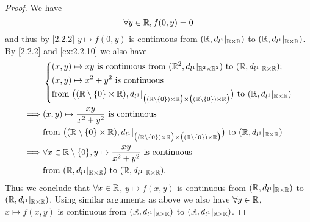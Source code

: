 \begin{proof}
  We have
  \[
    \forall y \in \mathbb{R}, f(0, y) = 0
  \]
  and thus by \cref{2.2.2} \(y \mapsto f(0, y)\) is continuous from \((\mathbb{R}, d_{l^1}|_{\mathbb{R} \times \mathbb{R}})\) to \((\mathbb{R}, d_{l^1}|_{\mathbb{R} \times \mathbb{R}})\).
  By \cref{2.2.2} and \cref{ex:2.2.10} we also have
  \begin{align*}
             & \begin{dcases}
                 (x, y) \mapsto x y \text{ is continuous from } (\mathbb{R}^2, d_{l^1}|_{\mathbb{R}^2 \times \mathbb{R}^2}) \text{ to } (\mathbb{R}, d_{l^1}|_{\mathbb{R} \times \mathbb{R}}); \\
                 (x, y) \mapsto x^2 + y^2 \text{ is continuous}                                                                                \\
                 \text{from } \big((\mathbb{R} \setminus \{0\} \times \mathbb{R}), d_{l^1}|_{\big((\mathbb{R} \setminus \{0\}) \times \mathbb{R}\big) \times \big((\mathbb{R} \setminus \{0\}) \times \mathbb{R}\big)}\big) \text{ to } (\mathbb{R}, d_{l^1}|_{\mathbb{R} \times \mathbb{R}})
               \end{dcases}  \\
    \implies & (x, y) \mapsto \dfrac{xy}{x^2 + y^2} \text{ is continuous}                                                                                                                                           \\
             & \text{from } \big((\mathbb{R} \setminus \{0\} \times \mathbb{R}), d_{l^1}|_{\big((\mathbb{R} \setminus \{0\}) \times \mathbb{R}\big) \times \big((\mathbb{R} \setminus \{0\}) \times \mathbb{R}\big)}\big) \text{ to } (\mathbb{R}, d_{l^1}|_{\mathbb{R} \times \mathbb{R}}) \\
    \implies & \forall x \in \mathbb{R} \setminus \{0\}, y \mapsto \dfrac{xy}{x^2 + y^2} \text{ is continuous}                                                                                                              \\
             & \text{from } (\mathbb{R}, d_{l^1}|_{\mathbb{R} \times \mathbb{R}}) \text{ to } (\mathbb{R}, d_{l^1}|_{\mathbb{R} \times \mathbb{R}}).
  \end{align*}
  Thus we conclude that \(\forall x \in \mathbb{R}\), \(y \mapsto f(x, y)\) is continuous from \((\mathbb{R}, d_{l^1}|_{\mathbb{R} \times \mathbb{R}})\) to \((\mathbb{R}, d_{l^1}|_{\mathbb{R} \times \mathbb{R}})\).
  Using similar arguments as above we also have \(\forall y \in \mathbb{R}\), \(x \mapsto f(x, y)\) is continuous from \((\mathbb{R}, d_{l^1}|_{\mathbb{R} \times \mathbb{R}})\) to \((\mathbb{R}, d_{l^1}|_{\mathbb{R} \times \mathbb{R}})\).


\end{proof}
